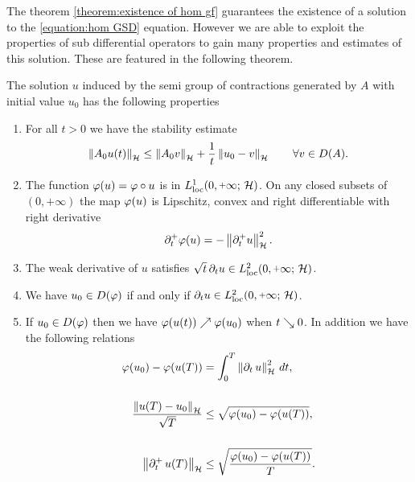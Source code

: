 The theorem \ref{theorem:existence of hom gf} guarantees the existence
of a solution to the \ref{equation:hom GSD} equation. However
we are able to exploit the properties of sub differential operators
to gain many properties and estimates of this solution. 
These are featured in the following theorem.  

\begin{theorem}\label{theorem:hom gf prop conv lsc func}
	The solution $ u $ induced by the semi group of contractions
	generated by $ A $ with initial value $ u_0 $ has the following properties
	\begin{enumerate}[label=(\roman*)]
		\item For all $ t>0 $ we have the stability estimate
		\begin{align}\label{equation:proper convex lsc est}
			\left\Vert A_0 u(t)\right\Vert_{\mathcal{H}}\leq \left\Vert A_0v\right\Vert_{\mathcal{H}}+\frac{1}{t}\left\Vert u_0-v\right\Vert_{\mathcal{H}}
			\qquad\forall v\in D(A).
		\end{align}
		\item The function $ \varphi(u)=\varphi\circ u $ is in
		$ L_{\mathrm{loc}}^1(0,\plus\infty;\,\rH) $. On any closed
		subsets of $ (0,\plus\infty) $ the map $ \varphi(u) $ is 
		Lipschitz, convex and
		right differentiable with right derivative 
		\begin{align*}
			\partial_t^+\varphi(u)=-\left\Vert \partial_t^+ u\right\Vert_{\mathcal{H}}^2.
		\end{align*}
		\item The weak derivative of $ u $ satisfies 
		$ \sqrt{t}\, \prt_t u\in  L_{\mathrm{loc}}^2(0,\plus\infty;\,\rH) $.
		\item We have $ u_0\in D(\varphi) $ if and only if
		$ \prt_t u\in L_{\mathrm{loc}}^2(0,\plus\infty;\,\rH) $.
		\item If $ u_0\in D(\varphi) $ then we have
		$ \varphi(u(t))\nearrow \varphi(u_0) $ when $ t\searrow 0 $.
		In addition we have the following relations
		\begin{align}
				\varphi(u_0)-\varphi(u(T))
				&=\int_0^T \left\Vert \partial_t\,u\right\Vert_{\mathcal{H}}^2\,dt,
				\label{equation:hom gf pclsc func comp with sol}\\[0.5cm]
				\frac{\left\Vert u(T)-u_0\right\Vert_{\mathcal{H}}}{\sqrt{T}}
				&\leq \sqrt{\varphi(u_0)-\varphi(u(T))},
				\label{equation:hom gf pclsc func right der}\\[0.5cm]
				\left\Vert \partial^+_t\,u(T)\right\Vert_{\mathcal{H}}
				&\leq \sqrt{\frac{\varphi(u_0)-\varphi(u(T))}{T}}.
				\label{equation:hom gf pclsc func dist from start}
		\end{align}
	\end{enumerate}
\end{theorem}
